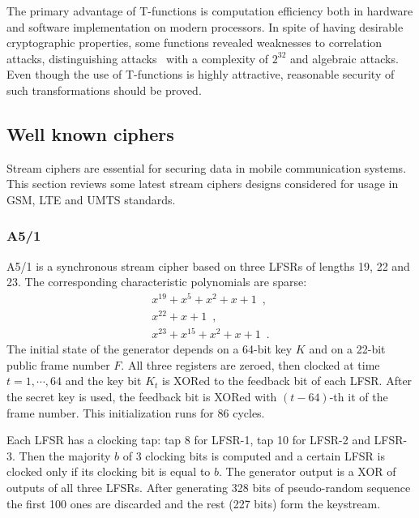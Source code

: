 The primary advantage of T-functions is computation efficiency both in hardware
and software implementation on modern processors. In spite of having desirable
cryptographic properties, some functions revealed weaknesses to correlation
attacks, distinguishing attacks~\cite{mycrypt/kunzli_jm05} with a complexity of
$2^{32}$ and algebraic attacks. Even though the use of T-functions is highly
attractive, reasonable security of such transformations should be proved.

\subsection{Well known ciphers}

Stream ciphers are essential for securing data in mobile communication systems.
This section reviews some latest stream ciphers designs considered for usage in
GSM, LTE and UMTS standards.

\subsubsection{A5/1}

A5/1 is a synchronous stream cipher based on three LFSRs of lengths 19, 22 and
23. The corresponding characteristic polynomials are sparse: 
\begin{equation}
    \begin{array}{ll}
        x^{19} + x^5 + x^2 + x + 1 \enspace, \\ 
        x^{22} + x + 1 \enspace, \\
        x^{23} + x^{15} + x^2 + x + 1 \enspace. 
    \end{array}
\end{equation}
The initial state of the generator depends on a 64-bit key $K$ and on a 22-bit
public frame number $F$. All three registers are zeroed, then clocked at time
$t = 1, \cdots, 64$ and the key bit $K_t$ is XORed to the feedback bit of each
LFSR. After the secret key is used, the feedback bit is XORed with $(t-64)$-th
it of the frame number. This initialization runs for 86 cycles.

Each LFSR has a clocking tap: tap 8 for LFSR-1, tap 10 for LFSR-2 and LFSR-3.
Then the majority $b$ of 3 clocking bits is computed and a certain LFSR is
clocked only if its clocking bit is equal to $b$. The generator output is
a XOR of outputs of all three LFSRs. After generating 328 bits of pseudo-random
sequence the first 100 ones are discarded and the rest (227 bits) form the
keystream.

